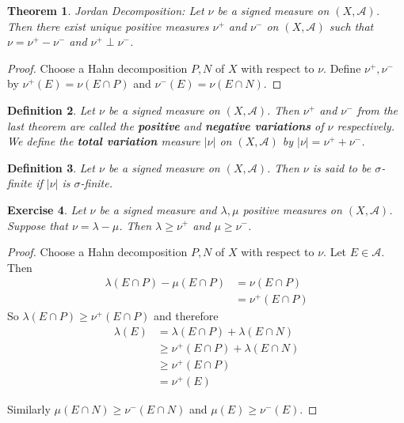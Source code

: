 \documentclass[12pt]{amsart}
\newtheorem{thm}{Theorem}[subsection]
\newtheorem{defn}[thm]{Definition}
\newtheorem{ex}[thm]{Exercise}
\newcommand{\lam}{\lambda}
\newcommand{\sig}{\sigma}
\newcommand{\MA}{\mathcal{A}}
\begin{document}
	\begin{thm}{Jordan Decomposition:}
		Let $\nu$ be a signed measure on $(X, \MA)$. Then there exist unique positive measures $\nu^+$ and $\nu^-$ on $(X, \MA)$ such that $\nu = \nu^+ - \nu^-$ and $\nu^+ \perp \nu^-$. 
	\end{thm}
	
	\begin{proof}
		Choose a Hahn decomposition $P,N$ of $X$ with respect to $\nu$. Define $\nu^+, \nu^-$ by $\nu^+(E)= \nu(E \cap P)$ and $\nu^-(E) = \nu(E \cap N)$.
	\end{proof}
	
	\begin{defn}
		Let $\nu$ be a signed measure on $(X, \MA)$. Then $\nu^+$ and $\nu^-$ from the last theorem are called the \textbf{positive} and \textbf{negative variations} of $\nu$ respectively. We define the \textbf{total variation} measure $|\nu|$ on $(X, \MA)$ by $|\nu| = \nu^+ + \nu^-$. 
	\end{defn}
	
	\begin{defn}
		Let $\nu$ be a signed measure on $(X,\MA)$. Then $\nu$ is said to be $\sig$-finite if $|\nu|$ is $\sig$-finite.
	\end{defn}
	
	\begin{ex}
		Let $\nu$ be a signed measure and $\lam, \mu$ positive measures on $(X,\MA)$. Suppose that $\nu = \lam - \mu$. Then $\lam \geq \nu^+$ and $\mu \geq \nu^-$.
	\end{ex}
	
	\begin{proof}
		Choose a Hahn decomposition $P,N$ of $X$ with respect to $\nu$. Let $E \in \MA$. Then 
		\begin{align*}
			\lam(E \cap P) - \mu(E \cap P) 
			&= \nu(E \cap P)\\
			&= \nu^+(E \cap P)
		\end{align*}
		So $\lam(E \cap P) \geq  \nu^+(E \cap P) $ and therefore 
		\begin{align*}
			\lam(E) 
			&= \lam(E \cap P) + \lam(E \cap N)\\
			& \geq \nu^+(E \cap P) + \lam (E \cap N)\\
			& \geq \nu^+(E \cap P)\\
			& = \nu^+(E)
		\end{align*} 
		
		Similarly $\mu(E \cap N) \geq \nu^-(E \cap N)$ and $\mu(E) \geq \nu^-(E)$.
	\end{proof}
	
\end{document}

